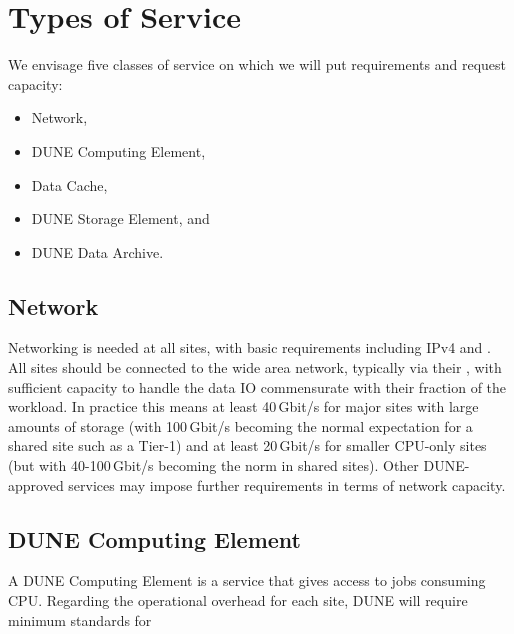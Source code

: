 \documentclass[../main-v1.tex]{subfiles}
\begin{document}
{\section{Types of Service}
\label{sec:cm:types_of_service}

We envisage five classes of service on which we will put requirements and request capacity:

\begin{itemize}
    \item Network,
    \item DUNE Computing Element,
    \item Data Cache,
    \item DUNE Storage Element, and
    \item DUNE Data Archive.
\end{itemize}

\subsection{Network}
\label{sec:cm:network}

Networking is needed at all sites, with basic requirements including IPv4 and . %
All sites should be connected to the wide area network, typically via their , with sufficient capacity to handle the data IO commensurate with their fraction of the workload. In practice this means at least 40\,Gbit/s for major sites with large amounts of storage (with 100\,Gbit/s becoming the normal expectation for a shared site such as a  Tier-1) and at least 20\,Gbit/s for smaller CPU-only sites (but with 40-100\,Gbit/s becoming the norm in shared sites).
Other DUNE-approved services may impose further requirements in terms of network capacity. %

\subsection{DUNE Computing Element}
\label{sec:cm:dce}

A DUNE Computing Element is a service that gives access to jobs consuming CPU. %
Regarding the operational overhead %
for each site, DUNE will require  minimum standards for

}
\end{document}
